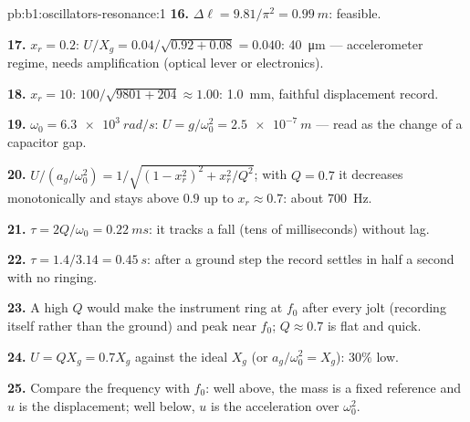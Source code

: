 \begin{solution}{pb:b1:oscillators-resonance:1}
\textbf{16.} $\Delta\ell = 9.81/\pi^2 = \qty{0.99}{m}$: feasible.

\textbf{17.} $x_r = 0.2$: $U/X_g = 0.04/\sqrt{0.92 + 0.08} = 0.040$:
\qty{40}{\micro m} --- accelerometer regime, needs amplification (optical
lever or electronics).

\textbf{18.} $x_r = 10$: $100/\sqrt{9801 + 204} \approx 1.00$: \qty{1.0}{mm},
faithful displacement record.

\textbf{19.} $\omega_0 = \qty{6.3e3}{rad/s}$: $U = g/\omega_0^2 = \qty{2.5e-7}{m}$
--- read as the change of a capacitor gap.

\textbf{20.} $U/(a_g/\omega_0^2) = 1/\sqrt{(1 - x_r^2)^2 + x_r^2/Q^2}$; with
$Q = 0.7$ it decreases monotonically and stays above $0.9$ up to
$x_r \approx 0.7$: about \qty{700}{Hz}.

\textbf{21.} $\tau = 2Q/\omega_0 = \qty{0.22}{ms}$: it tracks a fall (tens
of milliseconds) without lag.

\textbf{22.} $\tau = 1.4/3.14 = \qty{0.45}{s}$: after a ground step the
record settles in half a second with no ringing.

\textbf{23.} A high $Q$ would make the instrument ring at $f_0$ after
every jolt (recording itself rather than the ground) and peak near
$f_0$; $Q \approx 0.7$ is flat and quick.

\textbf{24.} $U = QX_g = 0.7X_g$ against the ideal $X_g$ (or $a_g/\omega_0^2
= X_g$): $30\%$ low.

\textbf{25.} Compare the  frequency with $f_0$: well above, the
mass is a fixed reference and $u$ is the displacement; well below, $u$
is the acceleration over $\omega_0^2$.
\end{solution}
